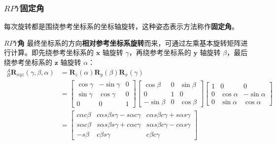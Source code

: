 \documentclass[cn,11pt,chinese,blue,bibstyle=ieeetr]{elegantbook}
\begin{document}
\subsubsection{\textbf{$RPY$}固定角}

每次旋转都是围绕参考坐标系的坐标轴旋转，这种姿态表示方法称作\textbf{固定角}。

\textbf{$RPY$角} 最终坐标系的方向\textbf{相对参考坐标系旋转}而来，可通过左乘基本旋转矩阵进行计算。即先绕参考坐标系的 $\bm{x}$ 轴旋转 $\gamma$，再绕参考坐标系的 $\bm{y}$ 轴旋转 $\beta$，最后绕参考坐标系的 $\bm{z}$ 轴旋转 $\alpha$：
\begin{equation}\label{rpy_fixed_angle}
	\begin{aligned}
		_B^A\bm{R}_{xyz}\left(\gamma, \beta, \alpha\right) &= \bm{R}_z\left(\alpha\right) \bm{R}_y\left(\beta\right) \bm{R}_x\left(\gamma\right) \\
		&=
		\begin{bmatrix}
			\cos\gamma & -\sin\gamma & 0 \\
			\sin\gamma & \cos\gamma  & 0 \\
			0          & 0           & 1
		\end{bmatrix}
		\begin{bmatrix}
			\cos\beta  & 0 & \sin\beta \\
			0           & 1 & 0          \\
			-\sin\beta & 0 & \cos\beta
		\end{bmatrix}
		\begin{bmatrix}
			1 & 0 		   & 0           \\
			0 & \cos\alpha & -\sin\alpha \\
			0 & \sin\alpha & \cos\alpha 
		\end{bmatrix} \\
		&=
		\begin{bmatrix}
			c\alpha c\beta & c\alpha s\beta s\gamma - s\alpha c\gamma & c\alpha s\beta c\gamma + s\alpha s\gamma \\
			s\alpha c\beta & s\alpha s\beta s\gamma + c\alpha c\gamma & s\alpha s\beta c\gamma - c\alpha s\gamma \\
			-s\beta        & c\beta s\gamma                           & c\beta c\gamma
		\end{bmatrix}
	\end{aligned}
\end{equation}
\end{document}
